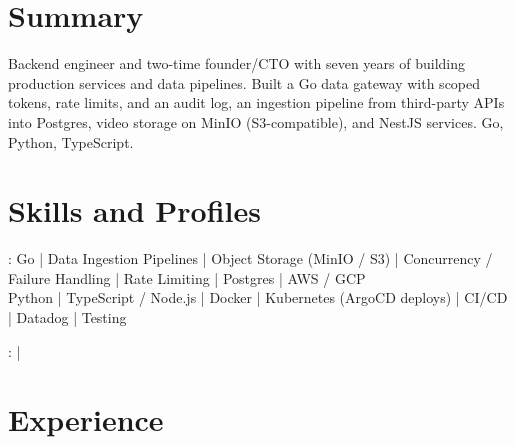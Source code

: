 \documentclass[print]{jack-resume}
\begin{document}
\pagecolor{darkmodeBackground}


\begin{minipage}[t][1cm][t]{.03\textwidth}
    \hfill
\end{minipage}

\section{Summary}
Backend engineer and two-time founder/CTO with seven years of building production services and data pipelines. Built a Go data gateway with scoped tokens, rate limits, and an audit log, an ingestion pipeline from third-party APIs into Postgres, video storage on MinIO (S3-compatible), and NestJS services. Go, Python, TypeScript.
\sectionsep

\section{Skills and Profiles}
:
Go \hfill | \hfill
Data Ingestion Pipelines \hfill | \hfill
Object Storage (MinIO / S3) \hfill | \hfill
Concurrency / Failure Handling \hfill | \hfill
Rate Limiting \hfill | \hfill
Postgres \hfill | \hfill
AWS / GCP \\
\hspace{1.0cm} Python \hfill | \hfill
TypeScript / Node.js \hfill | \hfill
Docker \hfill | \hfill
Kubernetes (ArgoCD deploys) \hfill | \hfill
CI/CD \hfill | \hfill
Datadog \hfill | \hfill
Testing \\

\raggedright{
    :
      \href{https://www.linkedin.com/in/jack-sturtevant/}{ \ExternalLink} |
     \href{https://github.com/jacksturt}{ \ExternalLink}}

\section{Experience}
\end{document}

